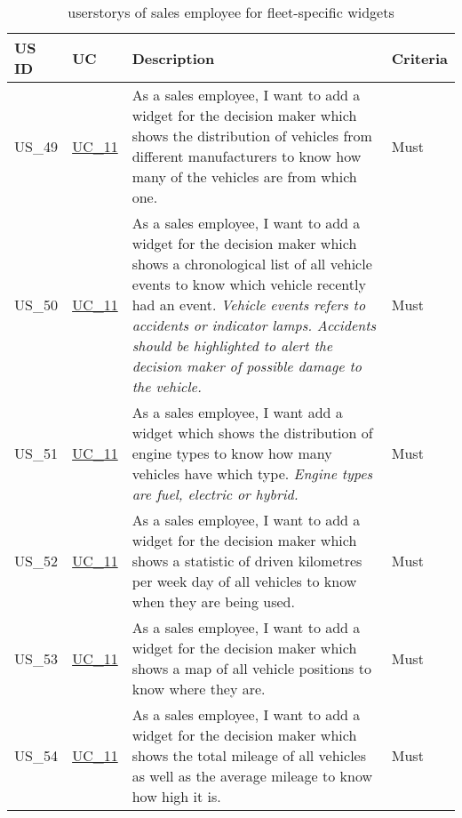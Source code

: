   \label{FlottenWidgets}
  \sffamily
  \begin{footnotesize}
    \begin{longtable}[L L L L ]{ p{} p{} p{} p{}}
      \caption                       %
          {\Glspl{userstory} of sales employee for fleet-specific \glspl{widget}} %
          \\
      \toprule
      \textbf{US ID} & \textbf{UC} & \textbf{Description} & \textbf{Criteria} \\
      \midrule
      \hypertarget{Ref:US49}{US\_49} & \hyperlink{Ref:UC11}{UC\_11} & As a sales employee, I want to add a \gls{widget} for the decision maker which shows the distribution of vehicles from different manufacturers to know how many of the vehicles are from which one. & Must  \\
      \hypertarget{Ref:US50}{US\_50} & \hyperlink{Ref:UC11}{UC\_11} & As a sales employee, I want to add a \gls{widget} for the decision maker which shows a chronological list of all vehicle events to know which vehicle recently had an event.
      \newline
      \emph{Vehicle events refers to accidents or indicator lamps. Accidents should be highlighted to alert the decision maker of possible damage to the vehicle.} & Must \\
      \hypertarget{Ref:US51}{US\_51} & \hyperlink{Ref:UC11}{UC\_11} & As a sales employee, I want add a \gls{widget} which shows the distribution of engine types to know how many vehicles have which type. 
      \newline
      \emph{Engine types are fuel, electric or hybrid.} & Must \\
      \hypertarget{Ref:US52}{US\_52} & \hyperlink{Ref:UC11}{UC\_11} & As a sales employee, I want to add a \gls{widget} for the decision maker which shows a statistic of driven kilometres per week day of all vehicles to know when they are being used. & Must \\
      \hypertarget{Ref:US53}{US\_53} & \hyperlink{Ref:UC11}{UC\_11} & As a sales employee, I want to add a \gls{widget} for the decision maker which shows a map of all vehicle positions to know where they are. & Must \\
      \hypertarget{Ref:US54}{US\_54} & \hyperlink{Ref:UC11}{UC\_11} & As a sales employee, I want to add a \gls{widget} for the decision maker which shows the total mileage of all vehicles as well as the average mileage to know how high it is. & Must \\
      \bottomrule
    \end{longtable}
  \end{footnotesize}
  \rmfamily
